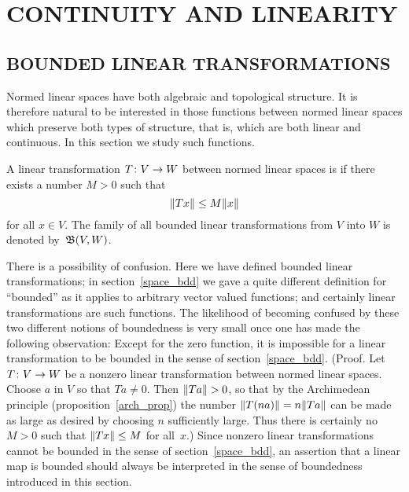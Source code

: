 \chapter{CONTINUITY AND LINEARITY}



\section{BOUNDED LINEAR TRANSFORMATIONS}\label{blt}
Normed linear spaces have both algebraic and topological structure.  It is therefore natural
to be interested in those functions between normed linear spaces which preserve both types of
structure, that is, which are both linear and continuous.  In this section we study such
functions.
\begin{defn}  A linear transformation $T \colon V \rightarrow W$ between normed linear spaces is
 if there exists a number $M > 0$ such that
  \[ \lVert Tx\rVert \le M \lVert x\rVert \]
for all $x \in V$.  The family of all bounded linear transformations from $V$ into $W$ is
denoted
by~$\mathfrak{B}(V,W)$.
\end{defn}

\begin{cau}  There is a possibility of confusion.  Here we have defined bounded linear
transformations; in section~\ref{space_bdd} we gave a quite different definition for
``bounded'' as it applies to arbitrary vector valued functions; and certainly linear
transformations are such functions.  The likelihood of becoming confused by these two
different notions of boundedness is very small once one has made the following observation:
Except for the zero function, it is impossible for a linear transformation to be bounded in
the sense of section~\ref{space_bdd}.  (Proof. Let $T\colon V \rightarrow W$ be a nonzero linear
transformation between normed linear spaces.  Choose $a$ in $V$ so that $Ta \ne 0$.  Then
$\lVert Ta\rVert > 0$, so that by the Archimedean principle (proposition~\ref{arch_prop}) the number
$\lVert T(na)\rVert = n\lVert Ta\rVert$ can be made as large as desired by choosing $n$ sufficiently
large.  Thus there is certainly no $M > 0$ such that $\lVert Tx\rVert \le M$ for all~$x$.)  Since
nonzero linear transformations cannot be bounded in the sense of section~\ref{space_bdd}, an
assertion that a linear map is bounded should always be interpreted in the sense of
boundedness introduced in this section.
\end{cau}

